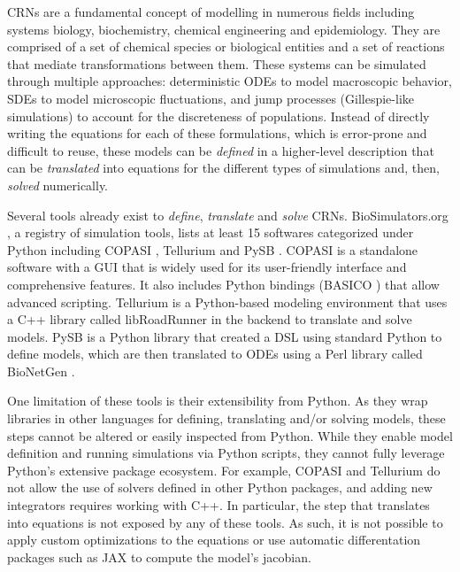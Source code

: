 \documentclass[namedate,numsec,webpdf,modern,large]{oup-authoring-template}
\theoremstyle{thmstyleone}%
\theoremstyle{thmstyletwo}%
\theoremstyle{thmstylethree}%
\begin{document}
\Acp{CRN} are a fundamental concept of modelling in numerous fields
including systems biology, biochemistry, chemical engineering and epidemiology.
They are comprised of a set of chemical species or biological entities
and a set of reactions that mediate transformations between them.
These systems can be simulated through multiple approaches:
deterministic \acp{ODE} to model macroscopic behavior,
\acp{SDE} to model microscopic fluctuations,
and jump processes (Gillespie-like simulations) to account for the discreteness of populations.
Instead of directly writing the equations for each of these formulations,
which is error-prone and difficult to reuse,
these models can be \emph{defined} in a higher-level description
that can be \emph{translated} into equations for the different types of simulations
and, then, \emph{solved} numerically.

Several tools already exist to \emph{define}, \emph{translate} and \emph{solve} \acp{CRN}.
BioSimulators.org \cite{shaikhBioSimulatorsCentralRegistry2022},
a registry of simulation tools,
lists at least 15 softwares categorized under Python including
COPASI \cite{hoopsCOPASICOmplexPAthway2006},
Tellurium \cite{choiTelluriumExtensiblePythonbased2018} and
PySB \cite{lopezProgrammingBiologicalModels2013}.
COPASI is a standalone software with a \ac{GUI}
that is widely used for its user-friendly interface and comprehensive features.
It also includes Python bindings (BASICO \cite{bergmannBASICOSimplifiedPython2023b}) that allow advanced scripting.
Tellurium is a Python-based modeling environment
that uses a C++ library called libRoadRunner \cite{welshLibRoadRunnerHighPerformance2023} in the backend to translate and solve models.
PySB is a Python library that created a \ac{DSL} using standard Python to define models,
which are then translated to \acp{ODE} using a Perl library called BioNetGen \cite{harrisBioNetGenAdvancesRulebased2016}.

One limitation of these tools is their extensibility from Python.
As they wrap libraries in other languages for defining, translating and/or solving models,
these steps cannot be altered or easily inspected from Python.
While they enable model definition and running simulations via Python scripts,
they cannot fully leverage Python's extensive package ecosystem.
For example,
COPASI and Tellurium do not allow the use of solvers defined in other Python packages,
and adding new integrators requires working with C++.
In particular, the step that translates into equations is not exposed by any of these tools.
As such, it is not possible to apply custom optimizations to the equations
or use automatic differentation packages such as JAX \cite{jax2018github} to compute the model's jacobian.
\end{document}
